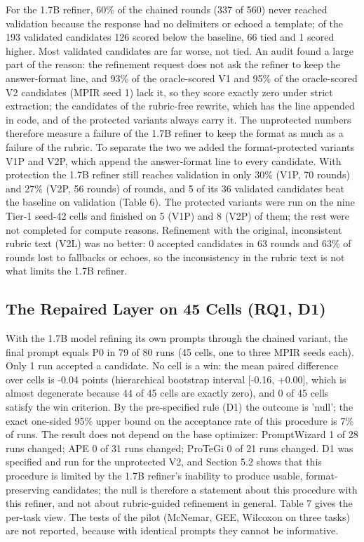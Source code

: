 \documentclass{ieeeaccess}
\begin{document}
For the 1.7B refiner, 60\% of the chained rounds (337 of 560) never reached validation because the response had no delimiters or echoed a template; of the 193 validated candidates 126 scored below the baseline, 66 tied and 1 scored higher. Most validated candidates are far worse, not tied. An audit found a large part of the reason: the refinement request does not ask the refiner to keep the answer-format line, and 93\% of the oracle-scored V1 and 95\% of the oracle-scored V2 candidates (MPIR seed 1) lack it, so they score exactly zero under strict extraction; the candidates of the rubric-free rewrite, which has the line appended in code, and of the protected variants always carry it. The unprotected numbers therefore measure a failure of the 1.7B refiner to keep the format as much as a failure of the rubric. To separate the two we added the format-protected variants V1P and V2P, which append the answer-format line to every candidate. With protection the 1.7B refiner still reaches validation in only 30\% (V1P, 70 rounds) and 27\% (V2P, 56 rounds) of rounds, and 5 of its 36 validated candidates beat the baseline on validation (Table 6). The protected variants were run on the nine Tier-1 seed-42 cells and finished on 5 (V1P) and 8 (V2P) of them; the rest were not completed for compute reasons. Refinement with the original, inconsistent rubric text (V2L) was no better: 0 accepted candidates in 63 rounds and 63\% of rounds lost to fallbacks or echoes, so the inconsistency in the rubric text is not what limits the 1.7B refiner.

\subsection{The Repaired Layer on 45 Cells (RQ1, D1)}

With the 1.7B model refining its own prompts through the chained variant, the final prompt equals P0 in 79 of 80 runs (45 cells, one to three MPIR seeds each). Only 1 run accepted a candidate. No cell is a win: the mean paired difference over cells is -0.04 points (hierarchical bootstrap interval [-0.16, +0.00], which is almost degenerate because 44 of 45 cells are exactly zero), and 0 of 45 cells satisfy the win criterion. By the pre-specified rule (D1) the outcome is 'null'; the exact one-sided 95\% upper bound on the acceptance rate of this procedure is 7\% of runs. The result does not depend on the base optimizer: PromptWizard 1 of 28 runs changed; APE 0 of 31 runs changed; ProTeGi 0 of 21 runs changed. D1 was specified and run for the unprotected V2, and Section 5.2 shows that this procedure is limited by the 1.7B refiner's inability to produce usable, format-preserving candidates; the null is therefore a statement about this procedure with this refiner, and not about rubric-guided refinement in general. Table 7 gives the per-task view. The tests of the pilot (McNemar, GEE, Wilcoxon on three tasks) are not reported, because with identical prompts they cannot be informative.
\end{document}
